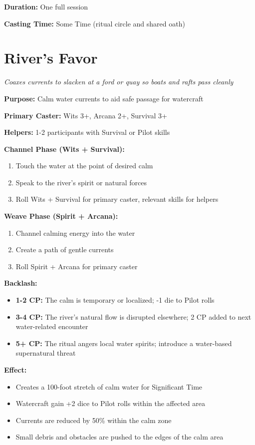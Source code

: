 \documentclass[12pt,twoside]{book}
\begin{document}
\textbf{Duration:} One full session

\textbf{Casting Time:} Some Time (ritual circle and shared oath)

	\section*{River's Favor}
	\textit{Coaxes currents to slacken at a ford or quay so boats and rafts pass cleanly}

	\textbf{Purpose:} Calm water currents to aid safe passage for watercraft

	\textbf{Primary Caster:} Wits 3+, Arcana 2+, Survival 3+

	\textbf{Helpers:} 1-2 participants with Survival or Pilot skills

	\textbf{Channel Phase (Wits + Survival):}
	\begin{enumerate}
	\item Touch the water at the point of desired calm
	\item Speak to the river's spirit or natural forces
	\item Roll Wits + Survival for primary caster, relevant skills for helpers
	\end{enumerate}

	\textbf{Weave Phase (Spirit + Arcana):}
	\begin{enumerate}
	\item Channel calming energy into the water
	\item Create a path of gentle currents
	\item Roll Spirit + Arcana for primary caster
	\end{enumerate}

	\textbf{Backlash:}
	\begin{itemize}
	\item \textbf{1-2 CP:} The calm is temporary or localized; -1 die to Pilot rolls
	\item \textbf{3-4 CP:} The river's natural flow is disrupted elsewhere; 2 CP added to next water-related encounter
	\item \textbf{5+ CP:} The ritual angers local water spirits; introduce a water-based supernatural threat
	\end{itemize}

	\textbf{Effect:}
	\begin{itemize}
	\item Creates a 100-foot stretch of calm water for Significant Time
	\item Watercraft gain +2 dice to Pilot rolls within the affected area
	\item Currents are reduced by 50\% within the calm zone
	\item Small debris and obstacles are pushed to the edges of the calm area
	\end{itemize}
\end{document}
